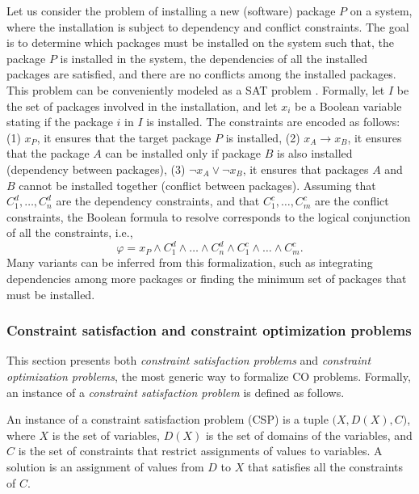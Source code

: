 \documentclass[twoside,11pt]{article}
\newcommand{\new}[1]{\emph{#1}}
\begin{document}
\begin{example}\hspace{1pt} \label{ex:sat} Let us consider the problem of installing a new (software) package $P$ on a system, where the installation is subject to dependency and conflict constraints.
The goal is to determine which packages must be installed on the system such that, the package $P$ is installed in the system, 
the dependencies of all the installed packages are satisfied, 
and there are no conflicts among the installed packages.
This problem can be conveniently modeled as a SAT problem \citep{tucker2007opium}. 
Formally, let $I$ be the set of packages involved in the installation, and let $x_i$ be a Boolean variable stating if the package $i$ in $I$ is installed. The constraints are encoded as follows: 
(1) $x_P$, it ensures that the target package $P$ is installed, 
(2) $x_A \to x_B$, it ensures that the package $A$ can be installed only if package $B$ is also installed (dependency between packages),
(3) $\neg x_A \lor \neg x_B$, it ensures that packages $A$ and $B$ cannot be installed together (conflict between packages).
Assuming that $C^d_1,\dots,C^d_n$ are the dependency constraints, and that $C^c_1,\dots,C^c_m$
are the conflict constraints, the Boolean formula to resolve corresponds to the logical conjunction of all the constraints, i.e.,
\begin{equation*}
\varphi = x_P \land C^d_1 \land \dots \land C^d_n \land C^c_1 \land \dots \land C^c_m.
\end{equation*}
Many variants can be inferred from this formalization, such as integrating dependencies among more packages or finding the minimum set of packages that must be installed.
\end{example}

\subsubsection{Constraint satisfaction and constraint optimization problems}

This section presents both  \emph{constraint satisfaction problems} and \emph{constraint optimization problems}, the most generic way to formalize CO problems.
Formally, an instance of a \new{constraint satisfaction problem} is defined as follows.

\begin{definition}
	An instance of a constraint satisfaction problem (CSP) is a tuple $\big( X, D(X), C \big)$, where $X$ is the set of variables, $D(X)$ is the set of domains of the variables, and $C$ is the set of constraints that restrict assignments of values to variables.
	A solution is an assignment of values from $D$ to  $X$ that satisfies all the constraints of $C$.
\end{definition}
\end{document}
